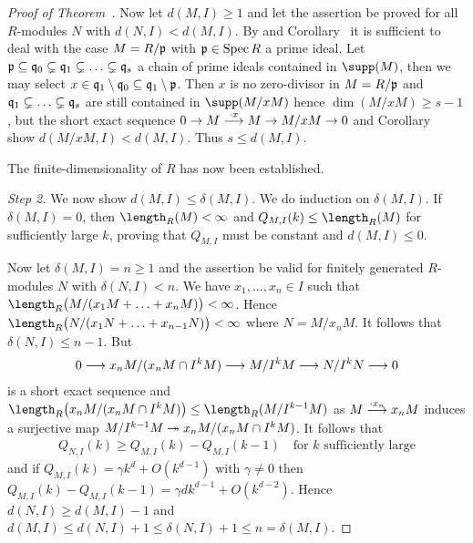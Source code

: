 \documentclass[a4paper,parskip=half,numbers=enddot, DIV=12, headheight=30pt]{scrreprt}
\begin{document}
\begin{proof}[Proof of Theorem~]
     Now let $d(M,I)\geq 1$ and let the assertion be proved for all $R$-modules $N$ with $d(N,I) < d(M,I)$. By  and Corollary~ it is sufficient to deal with the case $M=R/\mathfrak{p}$ with $\mathfrak{p}\in\operatorname{Spec} R$ a prime ideal. Let $\mathfrak{p} \subseteq \mathfrak{q}_0 \subsetneq \mathfrak{q}_1 \subsetneq \ldots \subsetneq \mathfrak{q}_s$ a chain of prime ideals contained in $\supp(M)$, then we may select $x\in \mathfrak{q}_1\setminus \mathfrak{q}_0 \subseteq \mathfrak{q}_1\setminus \mathfrak{p}$. Then $x$ is no zero-divisor in $M=R/\mathfrak{p}$ and $\mathfrak{q}_1\subsetneq \ldots \subsetneq \mathfrak{q}_s$ are still contained in $\supp(M/x M)$ hence $\dim(M/xM) \geq s -1$, but the short exact sequence $0\morphism M\morphism[\cdot x]M \morphism M/xM\morphism0$ and Corollary~ show $d(M/xM,I) <d(M,I)$. Thus $s \leq d(M,I)$.
    
    \begin{cor*}
        The finite-dimensionality of $R$ has now been established.
    \end{cor*}
    
    \emph{Step 2.} We now show $d(M,I)\leq \delta(M,I)$. We do induction on $\delta(M,I)$. If $\delta(M,I) = 0$, then $\length_R(M) < \infty$ and $Q_{M,I}(k) \leq \length_R(M)$ for sufficiently large $k$, proving that $Q_{M,I}$ must be constant and $d(M,I)\leq 0$. 
    
    Now let $\delta(M,I) =n\geq 1$ and the assertion be valid for finitely generated $R$-modules $N$ with $\delta(N,I) < n$. We have $x_1,\ldots,x_n\in I$ such that $\length_R\big(M/(x_1M+\ldots+x_nM)\big)< \infty$. Hence $\length_R\big(N/(x_1N+\ldots+x_{n-1}N)\big) < \infty$ where $N=M/x_n M$. It follows that $\delta(N,I) \leq n-1$. But
    \begin{align*}
        0 \morphism x_nM/(x_nM\cap I^k M) \morphism M/I^kM \morphism N/I^k N\morphism 0
    \end{align*}
    is a short exact sequence and $\length_R\big(x_nM/(x_nM\cap I^k M)\big) \leq \length_R(M/I^{k-1} M)$ as $M\morphism[\cdot x_n]x_nM$ induces a surjective map $M/I^{k-1} M \epimorphism x_nM / (x_nM \cap I^k M)$. It follows that 
    \begin{align*}
    	Q_{N,I}(k) \geq Q_{M,I}(k) - Q_{M,I}(k-1)\quad \text{for }k\text{ sufficiently large}
    \end{align*}
    and if $Q_{M,I} (k) = \gamma k^d + O(k^{d-1})$ with $\gamma\neq0$ then $Q_{M,I}(k) - Q_{M,I}(k-1) = \gamma dk^{d-1} + O(k^{d-2})$. Hence $d(N,I)\geq d(M,I) -1$ and $d(M,I) \leq d(N,I) +1 \leq \delta(N,I) +1 \leq n=\delta(M,I)$.
    

\end{proof}
\end{document}
